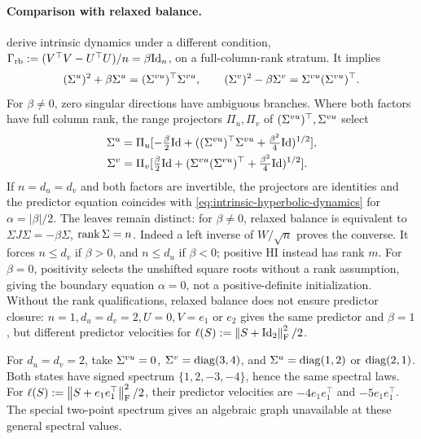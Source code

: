 \paragraph{Comparison with relaxed balance.}
\citet[Theorem 3.8]{MarcottePeyreGribonval2026} derive intrinsic dynamics
under a different condition,
\(\Gamma_{\rm rb}:=(V^\top V-U^\top U)/n=\beta\mathrm{Id}_n\),
on a full-column-rank stratum. It implies
\[
 (\Sigma^u)^2+\beta\Sigma^u=(\Sigma^{vu})^\top\Sigma^{vu},\qquad
 (\Sigma^v)^2-\beta\Sigma^v=\Sigma^{vu}(\Sigma^{vu})^\top.
\]
For \(\beta\ne0\), zero singular directions have ambiguous branches.
Where both factors have full column rank, the range projectors
\(\Pi_u,\Pi_v\) of \((\Sigma^{vu})^\top,\Sigma^{vu}\) select
\[
 \begin{aligned}
 \Sigma^u&=\Pi_u[-\tfrac\beta2\mathrm{Id}+
             ((\Sigma^{vu})^\top\Sigma^{vu}+\tfrac{\beta^2}{4}\mathrm{Id})^{1/2}],\\
 \Sigma^v&=\Pi_v[\tfrac\beta2\mathrm{Id}+
             (\Sigma^{vu}(\Sigma^{vu})^\top+\tfrac{\beta^2}{4}\mathrm{Id})^{1/2}].
 \end{aligned}
\]
If \(n=d_u=d_v\) and both factors are invertible, the projectors are
identities and the predictor equation coincides with
\eqref{eq:intrinsic-hyperbolic-dynamics} for \(\alpha=|\beta|/2\).
The leaves remain distinct: for \(\beta\ne0\), relaxed balance is equivalent to
\(\Sigma J\Sigma=-\beta\Sigma\), \(\operatorname{rank}\Sigma=n\).
Indeed a left inverse of \(W/\sqrt n\) proves the converse.
It forces \(n\le d_v\) if \(\beta>0\), and \(n\le d_u\) if \(\beta<0\);
positive HI instead has rank \(m\).
For \(\beta=0\), positivity selects the unshifted square roots without a
rank assumption, giving the boundary equation \(\alpha=0\), not a
positive-definite initialization.
Without the rank qualifications, relaxed balance does not ensure
predictor closure: \(n=1,d_u=d_v=2,U=0,V=e_1\) or \(e_2\) gives the
same predictor and \(\beta=1\), but different predictor velocities for
\(\ell(S):=\left\lVert S+\mathrm{Id}_2 \right\rVert_{\mathrm{F}}^2/2\).

\begin{remark}
For \(d_u=d_v=2\), take \(\Sigma^{vu}=0\), \(\Sigma^v=\operatorname{diag}(3,4)\), and
\(\Sigma^u=\operatorname{diag}(1,2)\) or \(\operatorname{diag}(2,1)\).
Both states have signed spectrum \(\{1,2,-3,-4\}\), hence the same
spectral laws. For \(\ell(S):=\left\lVert S+e_1e_1^\top \right\rVert_{\mathrm{F}}^2/2\),
their predictor velocities are \(-4e_1e_1^\top\) and
\(-5e_1e_1^\top\).
The special two-point spectrum gives an algebraic graph unavailable
at these general spectral values.
\end{remark}

